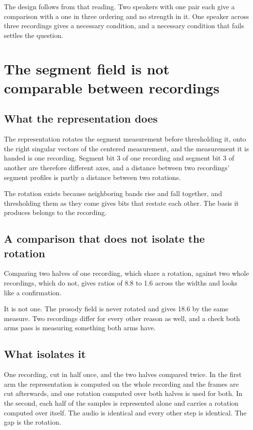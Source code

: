 The design follows from that reading. Two speakers with one pair each give a comparison with a one in
three ordering and no strength in it. One speaker across three recordings gives a necessary
condition, and a necessary condition that fails settles the question.

\section{The segment field is not comparable between recordings}

\subsection{What the representation does}

The representation rotates the segment measurement before thresholding it, onto the right singular
vectors of the centered measurement, and the measurement it is handed is one recording. Segment bit 3
of one recording and segment bit 3 of another are therefore different axes, and a distance between
two recordings' segment profiles is partly a distance between two rotations.

The rotation exists because neighboring bands rise and fall together, and thresholding them as they
come gives bits that restate each other. The basis it produces belongs to the recording.

\subsection{A comparison that does not isolate the rotation}

Comparing two halves of one recording, which share a rotation, against two whole recordings, which do
not, gives ratios of 8.8 to 1.6 across the widths and looks like a confirmation.

It is not one. The prosody field is never rotated and gives 18.6 by the same measure. Two recordings
differ for every other reason as well, and a check both arms pass is measuring something both arms
have.

\subsection{What isolates it}

One recording, cut in half once, and the two halves compared twice. In the first arm the
representation is computed on the whole recording and the frames are cut afterwards, and one
rotation computed over both halves is used for both. In the second, each half of the samples is represented
alone and carries a rotation computed over itself. The audio is identical and every other step is
identical. The gap is the rotation.

